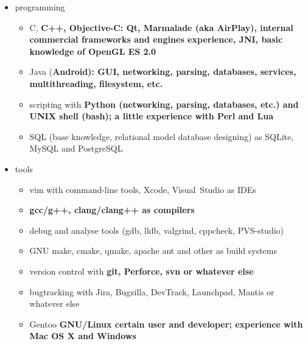\begin{itemize}

\item programming

    \begin{itemize}
    \item C, \bfseries C++\mdseries, Objective-C:
    Qt, Marmalade (aka AirPlay), internal commercial frameworks and engines experience,
    \bfseries JNI\mdseries, basic knowledge of OpenGL ES 2.0


    \item Java (\bfseries Android\mdseries):
    GUI, networking, parsing, databases, services, multithreading, filesystem, etc.


    \item scripting with
    \bfseries Python \mdseries (networking, parsing, databases, etc.)
    and
    \bfseries UNIX shell (bash)\mdseries;
    a little experience with
    \bfseries Perl \mdseries and \bfseries Lua\mdseries

    \item SQL (base knowledge, relational model database designing)
as SQLite, MySQL and PostgreSQL
    \end{itemize}

\item tools

    \begin{itemize}
    \item vim with command-line tools, Xcode, Visual~Studio as IDEs
    \item \bfseries gcc/g++\mdseries, clang/clang++ as compilers
    \item debug and analyse tools (gdb, lldb, valgrind, cppcheck, PVS-studio)
    \item GNU make, cmake, qmake, apache ant and other as build systems
    \item version control with \bfseries git\mdseries, Perforce, svn or whatever else
    \item bugtracking with Jira, Bugzilla, DevTrack, Launchpad, Mantis or whatever else
    \item Gentoo \bfseries GNU/Linux \mdseries certain user and developer;
    experience with \bfseries Mac OS X \mdseries and Windows
    \end{itemize}

\end{itemize}

